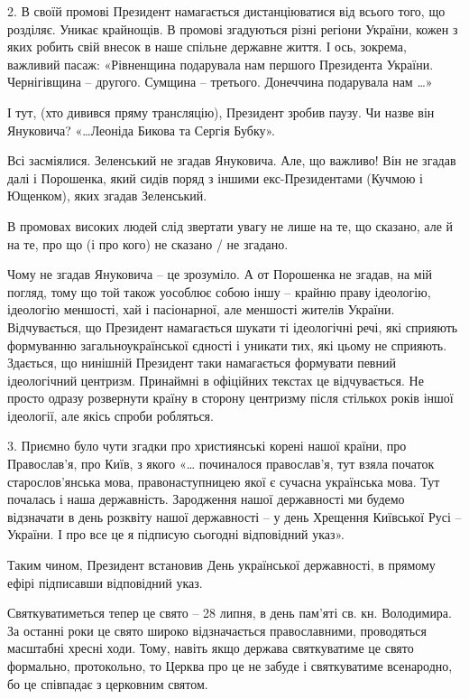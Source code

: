 2. В своїй промові Президент намагається дистанціюватися від всього того, що
розділяє. Уникає крайнощів. В промові згадуються різні регіони України, кожен з
яких робить свій внесок в наше спільне державне життя. І ось, зокрема, важливий
пасаж: «Рівненщина подарувала нам першого Президента України. Чернігівщина –
другого. Сумщина – третього. Донеччина подарувала нам …» 

І тут, (хто дивився пряму трансляцію), Президент зробив паузу. Чи назве він
Януковича? «…Леоніда Бикова та Сергія Бубку». 

Всі засміялися. Зеленський не згадав Януковича. Але, що важливо! Він не згадав
далі і Порошенка, який сидів поряд з іншими екс-Президентами (Кучмою і
Ющенком), яких згадав Зеленський. 

В промовах високих людей слід звертати увагу не лише на те, що сказано, але й
на те, про що (і про кого) не сказано / не згадано.

Чому не згадав Януковича – це зрозуміло. А от Порошенка не згадав, на мій
погляд, тому що той також уособлює собою іншу – крайню праву ідеологію,
ідеологію меншості, хай і пасіонарної, але меншості жителів України.
Відчувається, що Президент намагається шукати ті ідеологічні речі, які сприяють
формуванню загальноукраїнської єдності і уникати тих, які цьому не сприяють.
Здається, що нинішній Президент таки намагається формувати певний ідеологічний
центризм. Принаймні в офіційних текстах це відчувається.  Не просто одразу
розвернути країну в сторону центризму після стількох років іншої ідеології, але
якісь спроби робляться. 

3. Приємно було чути згадки про християнські корені нашої країни, про
Православ’я, про Київ, з якого «… починалося православ’я, тут взяла початок
старослов’янська мова, правонаступницею якої є сучасна українська мова. Тут
почалась і наша державність. Зародження нашої державності ми будемо відзначати
в день розквіту нашої державності – у день Хрещення Київської Русі – України. І
про все це я підписую сьогодні відповідний указ».

Таким чином, Президент встановив День української державності, в прямому ефірі підписавши відповідний указ.

Святкуватиметься тепер це свято – 28 липня, в день пам’яті св. кн. Володимира.
За останні роки це свято широко відзначається православними, проводяться
масштабні хресні ходи. Тому, навіть якщо держава святкуватиме це свято
формально, протокольно, то Церква про це не забуде і святкуватиме всенародно,
бо це співпадає з церковним святом. 

